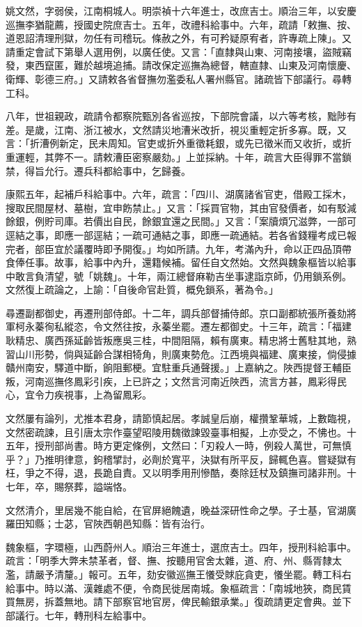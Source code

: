 \begin{pinyinscope}
姚文然，字弱侯，江南桐城人。明崇禎十六年進士，改庶吉士。順治三年，以安慶巡撫李猶龍薦，授國史院庶吉士。五年，改禮科給事中。六年，疏請「敕撫、按、道恩詔清理刑獄，勿任有司稽玩。條赦之外，有可矜疑原宥者，許專疏上陳」。又請重定會試下第舉人選用例，以廣任使。又言：「直隸與山東、河南接壤，盜賊竊發，東西竄匿，難於越境追捕。請改保定巡撫為總督，轄直隸、山東及河南懷慶、衛輝、彰德三府。」又請敕各省督撫勿濫委私人署州縣官。諸疏皆下部議行。尋轉工科。

八年，世祖親政，疏請令都察院甄別各省巡按，下部院會議，以六等考核，黜陟有差。是歲，江南、浙江被水，文然請災地漕米改折，視災重輕定折多寡。既，又言：「折漕例新定，民未周知。官吏或折外重徵耗銀，或先已徵米而又收折，或折重運輕，其弊不一。請敕漕臣密察嚴劾。」上並採納。十年，疏言大臣得罪不當鎖禁，得旨允行。遷兵科都給事中，乞歸養。

康熙五年，起補戶科給事中。六年，疏言：「四川、湖廣諸省官吏，借殿工採木，搜取民間屋材、墓樹，宜申飭禁止。」又言：「採買官物，其由官發價者，如有駁減餘銀，例貯司庫。若價出自民，餘銀宜還之民間。」又言：「案牘煩冗滋弊，一部可逕結之事，即應一部逕結；一疏可通結之事，即應一疏通結。若各省錢糧考成已報完者，部臣宜於議覆時即予開復。」均如所請。九年，考滿內升，命以正四品頂帶食俸任事。故事，給事中內升，還籍候補。留任自文然始。文然與魏象樞皆以給事中敢言負清望，號「姚魏」。十年，兩江總督麻勒吉坐事逮詣京師，仍用鎖系例。文然復上疏論之，上諭：「自後命官赴質，概免鎖系，著為令。」

尋遷副都御史，再遷刑部侍郎。十二年，調兵部督捕侍郎。京口副都統張所養劾將軍柯永蓁徇私縱恣，令文然往按，永蓁坐罷。遷左都御史。十三年，疏言：「福建耿精忠、廣西孫延齡皆叛應吳三桂，中間阻隔，賴有廣東。精忠將士舊駐其地，熟習山川形勢，倘與延齡合謀相犄角，則廣東勢危。江西境與福建、廣東接，倘侵據贛州南安，驛道中斷，餉阻郵梗。宜駐重兵通聲援。」上嘉納之。陜西提督王輔臣叛，河南巡撫佟鳳彩引疾，上已許之；文然言河南近陜西，流言方甚，鳳彩得民心，宜令力疾視事，上為留鳳彩。

文然屢有論列，尤推本君身，請節慎起居。孝誠皇后崩，權攢鞏華城，上數臨視，文然密疏諫，且引唐太宗作臺望昭陵用魏徵諫毀臺事相擬，上亦受之，不怫也。十五年，授刑部尚書。時方更定條例，文然曰：「刃殺人一時，例殺人萬世，可無慎乎？」乃推明律意，鉤稽揅討，必劑於寬平，決獄有所平反，歸輒色喜。嘗疑獄有枉，爭之不得，退，長跪自責。又以明季用刑慘酷，奏除廷杖及鎮撫司諸非刑。十七年，卒，賜祭葬，謚端恪。

文然清介，里居幾不能自給，在官屏絕餽遺，晚益深研性命之學。子士基，官湖廣羅田知縣；士苾，官陜西朝邑知縣：皆有治行。

魏象樞，字環極，山西蔚州人。順治三年進士，選庶吉士。四年，授刑科給事中。疏言：「明季大弊未禁革者，督、撫、按聽用官舍太雜，道、府、州、縣胥隸太濫，請嚴予清釐。」報可。五年，劾安徽巡撫王懩受賕庇貪吏，懩坐罷。轉工科右給事中。時以滿、漢雜處不便，令商民徙居南城。象樞疏言：「南城地狹，商民賃買無房，拆蓋無地。請下部察官地官房，俾民輸銀承業。」復疏請更定會典。並下部議行。七年，轉刑科左給事中。


\end{pinyinscope}
